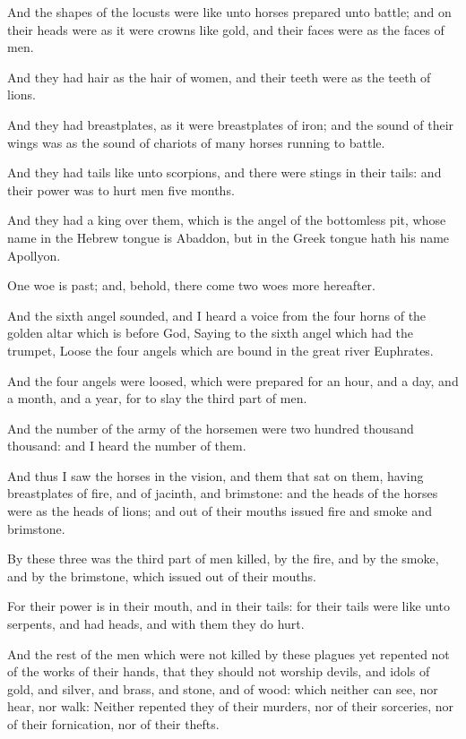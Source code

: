 \verse And the shapes of the locusts were like unto horses prepared unto battle; and on their heads were as it were crowns like gold, and their faces were as the faces of men.

\verse And they had hair as the hair of women, and their teeth were as the teeth of lions.

\verse And they had breastplates, as it were breastplates of iron; and the sound of their wings was as the sound of chariots of many horses running to battle.

\verse And they had tails like unto scorpions, and there were stings in their tails: and their power was to hurt men five months.

\verse And they had a king over them, which is the angel of the bottomless pit, whose name in the Hebrew tongue is Abaddon, but in the Greek tongue hath his name Apollyon.

\verse One woe is past; and, behold, there come two woes more hereafter.

\verse And the sixth angel sounded, and I heard a voice from the four horns of the golden altar which is before God, \verse Saying to the sixth angel which had the trumpet, Loose the four angels which are bound in the great river Euphrates.

\verse And the four angels were loosed, which were prepared for an hour, and a day, and a month, and a year, for to slay the third part of men.

\verse And the number of the army of the horsemen were two hundred thousand thousand: and I heard the number of them.

\verse And thus I saw the horses in the vision, and them that sat on them, having breastplates of fire, and of jacinth, and brimstone: and the heads of the horses were as the heads of lions; and out of their mouths issued fire and smoke and brimstone.

\verse By these three was the third part of men killed, by the fire, and by the smoke, and by the brimstone, which issued out of their mouths.

\verse For their power is in their mouth, and in their tails: for their tails were like unto serpents, and had heads, and with them they do hurt.

\verse And the rest of the men which were not killed by these plagues yet repented not of the works of their hands, that they should not worship devils, and idols of gold, and silver, and brass, and stone, and of wood: which neither can see, nor hear, nor walk: \verse Neither repented they of their murders, nor of their sorceries, nor of their fornication, nor of their thefts.

